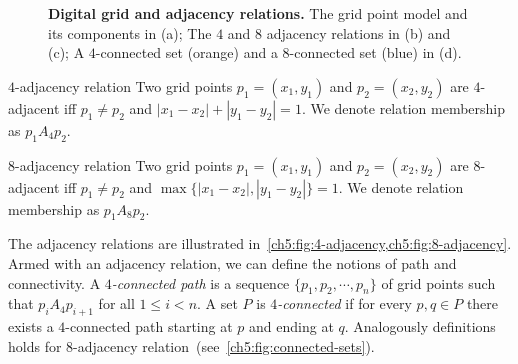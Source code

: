 \begin{figure}
\begin{minipage}{0.4\textwidth}
\end{minipage}

\caption{\textbf{Digital grid and adjacency relations.} The grid point model and its components in (a); The $4$ and $8$ adjacency relations in (b) and (c); A $4$-connected set (orange) and a $8$-connected set (blue) in (d).}
\label{ch5:fig:digital-grid}
\end{figure}

\begin{definition}{$4$-adjacency relation}
Two grid points $p_1=(x_1,y_1)$ and $p_2=(x_2,y_2)$ are $4$-adjacent iff $p_1 \neq p_2$ and $|x_1-x_2| + |y_1-y_2| = 1$. We denote relation membership as $p_1A_4p_2$.
\end{definition}

\begin{definition}{$8$-adjacency relation}
Two grid points $p_1=(x_1,y_1)$ and $p_2=(x_2,y_2)$ are $8$-adjacent iff $p_1 \neq p_2$ and $\max \{ |x_1-x_2|, |y_1-y_2| \} = 1$. We denote relation membership as $p_1A_8p_2$.
\end{definition}

The adjacency relations are illustrated in~\cref{ch5:fig:4-adjacency,ch5:fig:8-adjacency}. Armed with an adjacency relation, we can define the notions of path and connectivity. A \emph{$4$-connected path} is a sequence $\{p_1,p_2,\cdots, p_n\}$ of grid points such that $p_iA_4p_{i+1}$ for all $1 \leq i < n$. A set $P$ is \emph{$4$-connected} if for every $p,q \in P$ there exists a $4$-connected path starting at $p$ and ending at $q$. Analogously definitions holds for $8$-adjacency relation~(see~\cref{ch5:fig:connected-sets}).


